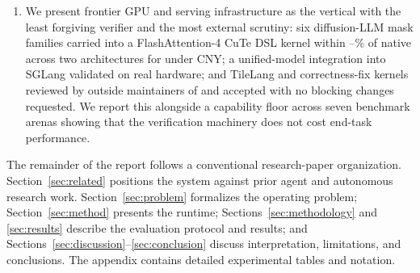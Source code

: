 \begin{enumerate}[label=\textbf{C\arabic*.}]
    and a parameter-changing axis, which moves the capability ceiling itself. We
    report the runtime building and running a from-scratch 1B pretraining stack on an
    eight-GPU B200 node as the entry condition for the second axis, and state
    precisely what remains: training on its own retained trajectories rather than a
    public corpus, and measuring whether a model produced this way improves the
    runtime that built it.
  \item We present frontier GPU and serving infrastructure as the vertical with the
    least forgiving verifier and the most external scrutiny: six diffusion-LLM mask
    families carried into a FlashAttention-4 CuTe DSL kernel within
    \FlashDAGapLow--\FlashDAGapHigh\% of native across two architectures for under
    \FlashDACostCNY{} CNY; a unified-model integration into SGLang validated on real
    hardware; and TileLang and correctness-fix kernels reviewed by outside
    maintainers of  and accepted with no blocking
    changes requested. We report this alongside a capability floor across seven
    benchmark arenas showing that the verification machinery does not cost end-task
    performance.
\end{enumerate}

The remainder of the report follows a conventional research-paper organization.
Section~\ref{sec:related} positions the system against prior agent and
autonomous research work. Section~\ref{sec:problem} formalizes the operating problem;
Section~\ref{sec:method} presents the runtime; Sections~\ref{sec:methodology} and
\ref{sec:results} describe the evaluation protocol and results; and
Sections~\ref{sec:discussion}--\ref{sec:conclusion} discuss interpretation,
limitations, and conclusions. The appendix contains detailed experimental tables
and notation.
